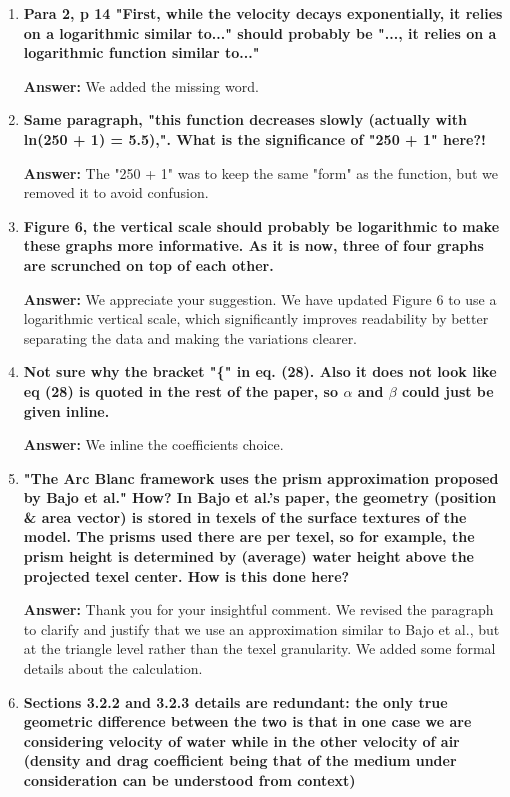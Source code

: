 \documentclass{article}
\newcommand{\answer}[1]{\textbf{\textcolor{answercolor}{Answer:}} \textcolor{answercolor}{#1}}
\begin{document}
\begin{enumerate}[label=\textbf{\arabic*.}]
	\item \textbf{Para 2, p 14 "First, while the velocity decays exponentially, it relies on a logarithmic similar to..." should probably be "..., it relies on a logarithmic function similar to..."}

	      \answer{We added the missing word.}

	\item \textbf{Same paragraph, "this function decreases slowly (actually with ln(250 + 1) = 5.5),". What is the significance of "250 + 1" here?!}

	      \answer{The "250 + 1" was to keep the same "form" as the function, but we removed it to avoid confusion.}

	\item \textbf{Figure 6, the vertical scale should probably be logarithmic to make these graphs more informative. As it is now, three of four graphs are scrunched on top of each other.}

	      \answer{We appreciate your suggestion. We have updated Figure 6 to use a logarithmic vertical scale, which significantly improves readability by better separating the data and making the variations clearer.}

	\item \textbf{Not sure why the bracket "\{" in eq. (28). Also it does not look like eq (28) is quoted in the rest of the paper, so $\alpha$ and $\beta$ could just be given inline.}

	      \answer{We inline the coefficients choice.}

	\item \textbf{"The Arc Blanc framework uses the prism approximation proposed by Bajo et al." How? In Bajo et al.’s paper, the geometry (position \& area vector) is stored in texels of the surface textures of the model. The prisms used there are per texel, so for example, the prism height is determined by (average) water height above the projected texel center. How is this done here?}

	      \answer{Thank you for your insightful comment. We revised the paragraph to clarify and justify that we use an approximation similar to Bajo et al., but at the triangle level rather than the texel granularity. We added some formal details about the calculation.}

	\item \textbf{Sections 3.2.2 and 3.2.3 details are redundant: the only true geometric difference between the two is that in one case we are considering velocity of water while in the other velocity of air (density and drag coefficient being that of the medium under consideration can be understood from context)}


\end{enumerate}
\end{document}
